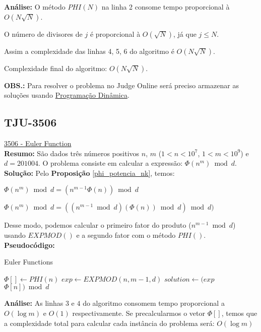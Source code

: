 \textbf{Análise:}
O método $PHI(N)$ na linha 2 consome tempo proporcional à $O(N\sqrt{N})$.

O número de divisores de $j$ é proporcional à $O(\sqrt{N})$, já que $j \leq N$.

Assim a complexidade das linhas 4, 5, 6 do algoritmo é $O(N\sqrt{N})$.

Complexidade final do algoritmo: $O(N\sqrt{N})$.

\textbf{OBS.:} Para resolver o problema no Judge Online será preciso armazenar as soluções usando \href{https://linux.ime.usp.br/~stefanot/mac499/template.pdf}{Programação Dinâmica}.






\subsection{TJU-3506}
\href{http://acm.tju.edu.cn/toj/showp3506.html}{3506 - Euler Function} \\

\textbf{Resumo:}
São dados três números positivos $n$, $m$ ($1 < n < 10^7$, $1 < m < 10^9$) e $d = 201004$.
O problema consiste em calcular a expressão: $\Phi(n^m) \bmod d$.
\\

\textbf{Solução:}
Pelo \textbf{Proposição} \autoref{phi_potencia_nk}, temos: 

$\Phi(n^m) \bmod d = (n^{m-1}\Phi(n)) \bmod d$

$\Phi(n^m) \bmod d = ((n^{m-1} \bmod d)(\Phi(n)) \bmod d) \bmod d)$

Desse modo, podemos calcular o primeiro fator do produto ($n^{m-1} \bmod d$) usando $EXPMOD()$ e a segundo fator com o método $PHI()$.
\\

\textbf{Pseudocódigo:}
\begin{algorithm}
\caption{Euler Functions}
\begin{algorithmic}[1]
\State $\Phi[] \gets PHI(n)$
\State $exp \gets EXPMOD(n, m-1, d)$
\State $solution \gets (exp$ $\Phi[n]) \bmod d$
\State {}
\EndProcedure
\end{algorithmic}
\end{algorithm}

\textbf{Análise:}
As linhas $3$ e $4$ do algoritmo consomem tempo proporcional a $O(\log m)$ e $O(1)$ respectivamente.
Se precalcularmos o vetor $\Phi[]$, temos que a complexidade total para calcular cada instância do problema será: $O(\log m)$ 



